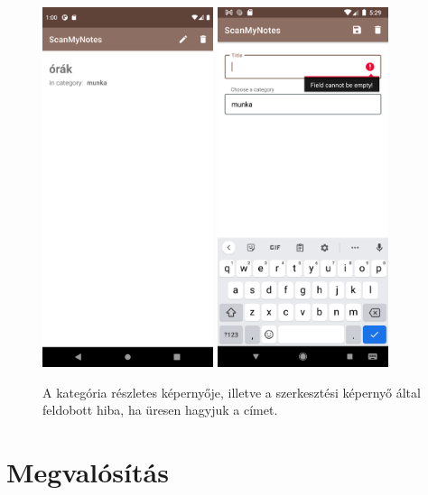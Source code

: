 \begin{figure}[!ht]
	\centering
	\includegraphics[width=50mm, keepaspectratio]{figures/category_view.png}
	\includegraphics[width=50mm, keepaspectratio]{figures/category_edit_error.png}
	\caption{A kategória részletes képernyője, illetve a szerkesztési képernyő által feldobott hiba, ha üresen hagyjuk a címet.}
	\label{fig:CategoryDetailsScreen}
\end{figure}

\section{Megvalósítás}

